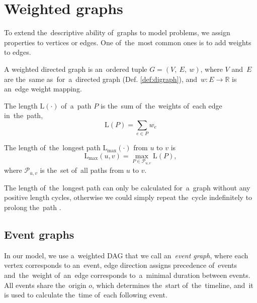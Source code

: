 \FloatBarrier

\section{Weighted graphs}

To extend the~descriptive ability of~graphs to model problems, we assign properties to vertices or edges. One of~the~most common ones is to add weights to edges.

\begin{definition}
A weighted directed graph is an~ordered tuple $G = (V,\ E,\ w)$, where $V$ and~$E$ are the~same as~for~a~directed graph (Def. \ref{def:digraph}), and~$w: E \rightarrow \mathbb{R}$ is an~edge weight mapping.
\end{definition}


\begin{definition}
The length $\mathrm{L}(\cdot)$ of~a~path $P$ is the~sum of~the~weights of~each edge in~the~path,
\begin{equation}
\mathrm{L}(P) = \sum_{e \in P} w_e
\end{equation}
\end{definition}


\begin{definition}
The length of~the~longest path $\mathrm{L_{max}}(\cdot)$ from $u$ to $v$ is
\begin{equation}
	\mathrm{L_{max}}(u, v) = \max_{P \in \mathcal{P}_{u,v}}\mathrm{L}(P),
\end{equation}
where $\mathcal{P}_{u,v}$ is the~set of~all paths from $u$ to $v$.
\end{definition}

\begin{remark}
The length of~the~longest path can only be calculated for~a~graph without any positive length cycles, otherwise we could simply repeat the~cycle indefinitely to prolong the~path \cite{gross2013handbook}.
\end{remark}

\subsection{Event graphs}
\label{sec:event_graphs}

In our model, we use a~weighted DAG that we call an~\emph{event graph}, where each vertex corresponds to an~event, edge direction assigns precedence of~events and~the~weight of~an~edge corresponds to~a~minimal duration between events. All events share the~origin $o$, which determines the~start of~the~timeline, and~it is used to calculate the~time of~each following event.

